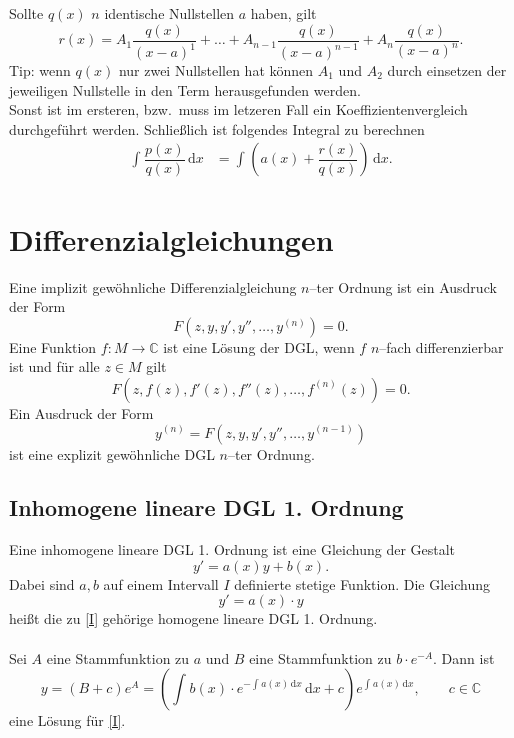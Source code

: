 \documentclass[a4paper,12pt]{article}
\newcommand{\td}{\,\text{d}}
\numberwithin{equation}{section}
\begin{document}
Sollte $q\left(x\right)$ $n$ identische Nullstellen $a$ haben, gilt
\[ 
        r\left(x\right)=A_1\dfrac{q\left(x\right)}{\left(x-a\right)^1}+\hdots+A_{n-1}\dfrac{q\left(x\right)}{\left(x-a\right)^{n-1}}+A_n\dfrac{q\left(x\right)}{\left(x-a\right)^n}
.\]
Tip: wenn $q\left(x\right)$ nur zwei Nullstellen hat können $A_1$ und $A_2$ durch einsetzen der jeweiligen Nullstelle in den Term herausgefunden werden.\\
Sonst ist im ersteren, bzw.\ muss im letzeren Fall ein Koeffizientenvergleich durchgeführt werden. Schließlich ist folgendes Integral zu berechnen
\begin{align*}
        \int_{}^{}\dfrac{p\left(x\right)}{q\left(x\right)}\td x&=\int_{}^{}\left(a\left(x\right)+\dfrac{r\left(x\right)}{q\left(x\right)}\right)\td x
.\end{align*}
\section{Differenzialgleichungen}
Eine implizit gewöhnliche Differenzialgleichung $n$--ter Ordnung ist ein Ausdruck der Form
\[ 
        F\left(z,y,y',y'',\hdots ,y^{\left(n\right)}\right)=0
.\] 
Eine Funktion $f:M\rightarrow \mathbb{C}$ ist eine Lösung der DGL, wenn $f$ $n$--fach differenzierbar ist und für alle $z \in M$ gilt
\[ 
        F\left(z,f\left(z\right),f'\left(z\right),f''\left(z\right),\hdots ,f^{\left(n\right)}\left(z\right)\right)=0
.\] 
Ein Ausdruck der Form
\[ 
        y^{\left(n\right)}=F\left(z,y,y',y'',\hdots ,y^{\left(n-1\right)}\right)
\] 
ist eine explizit gewöhnliche DGL $n$--ter Ordnung.

\subsection{Inhomogene lineare DGL 1. Ordnung}
Eine inhomogene lineare DGL 1. Ordnung ist eine Gleichung der Gestalt
\[ 
        y'=a\left(x\right)y+b\left(x\right)\tag{I}\label{I}
.\] 
Dabei sind $a,b$ auf einem Intervall $I$ definierte stetige Funktion. Die Gleichung
\[ 
        y'=a\left(x\right)\cdot y
\] 
heißt die zu \eqref{I} gehörige homogene lineare DGL 1. Ordnung.\\\\
Sei $A$ eine Stammfunktion zu $a$ und $B$ eine Stammfunktion zu $b \cdot e^{-A}$. Dann ist
\[ 
        y=\left(B+c\right)e^{A}=\left(\int_{}^{}b\left(x\right)\cdot e^{-\int_{}^{}a\left(x\right)\td x}\td x+c\right)e^{\int_{}^{}a\left(x\right)\td x},\qquad c \in \mathbb{C}
\] 
eine Lösung für \eqref{I}.
\end{document}
